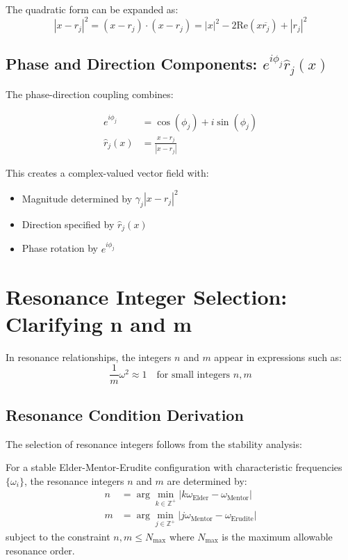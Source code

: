 The quadratic form can be expanded as:
\begin{equation}
|x - r_j|^2 = (x - r_j) \cdot (x - r_j) = |x|^2 - 2\text{Re}(x \overline{r_j}) + |r_j|^2
\end{equation}

\subsection{Phase and Direction Components: $e^{i\phi_j} \hat{r}_j(x)$}

The phase-direction coupling combines:

\begin{align}
e^{i\phi_j} &= \cos(\phi_j) + i\sin(\phi_j) \\
\hat{r}_j(x) &= \frac{x - r_j}{|x - r_j|}
\end{align}

This creates a complex-valued vector field with:
\begin{itemize}
    \item Magnitude determined by $\gamma_j |x - r_j|^2$
    \item Direction specified by $\hat{r}_j(x)$
    \item Phase rotation by $e^{i\phi_j}$
\end{itemize}

\section{Resonance Integer Selection: Clarifying n and m}

In resonance relationships, the integers $n$ and $m$ appear in expressions such as:
\begin{equation}
\frac{1}{m}\omega^2 \approx 1 \quad \text{for small integers } n, m
\end{equation}

\subsection{Resonance Condition Derivation}

The selection of resonance integers follows from the stability analysis:

\begin{theorem}
For a stable Elder-Mentor-Erudite configuration with characteristic frequencies $\{\omega_i\}$, the resonance integers $n$ and $m$ are determined by:
\begin{align}
n &= \arg\min_{k \in \mathbb{Z}^+} \left| k\omega_{\text{Elder}} - \omega_{\text{Mentor}} \right| \\
m &= \arg\min_{j \in \mathbb{Z}^+} \left| j\omega_{\text{Mentor}} - \omega_{\text{Erudite}} \right|
\end{align}
subject to the constraint $n, m \leq N_{\max}$ where $N_{\max}$ is the maximum allowable resonance order.
\end{theorem}

